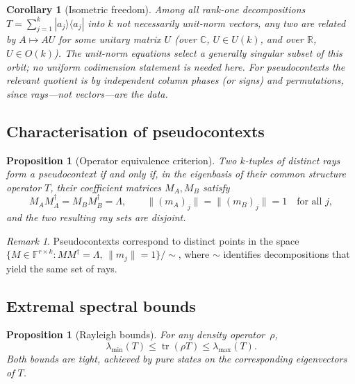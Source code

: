 \documentclass[
  twocolumn,
  aps,
  pra,
  floatfix,
  amsmath,amssymb,
  longbibliography
]{revtex4-2}
\newtheorem{proposition}[theorem]{Proposition}
\newtheorem{corollary}[theorem]{Corollary}
\theoremstyle{definition}
\theoremstyle{remark}
\newtheorem{remark}[theorem]{Remark}
\begin{document}
\begin{corollary}[Isometric freedom]\label{cor:unitary}
Among all rank-one decompositions $T=\sum_{j=1}^{k}|a_j\rangle\langle
a_j|$ into $k$ \emph{not necessarily} unit-norm vectors, any two are
related by $A\mapsto AU$ for some unitary matrix \(U\) (over \(\mathbb C\), \(U\in U(k)\), and over \(\mathbb R\), \(U\in O(k)\)).  The
unit-norm equations select a generally singular subset of this orbit;
no uniform codimension statement is needed here.  For pseudocontexts the
relevant quotient is by independent column phases (or signs) and
permutations, since rays---not vectors---are the data.
\end{corollary}

\subsection{Characterisation of pseudocontexts}

\begin{proposition}[Operator equivalence criterion]\label{prop:pseudo_equiv}
Two \(k\)-tuples of distinct rays form a pseudocontext if and only if, in the eigenbasis of their common structure operator \(T\), their coefficient matrices \(M_A,M_B\) satisfy
\[
M_AM_A^\dagger=M_BM_B^\dagger=\Lambda,
\qquad
\|(m_A)_j\|=\|(m_B)_j\|=1
\quad\text{for all }j,
\]
and the two resulting ray sets are disjoint.
\end{proposition}

\begin{remark}
Pseudocontexts correspond to distinct points in the space
$\{M\in\mathbb{F}^{r\times k}:MM^\dagger=\Lambda,\,\|m_j\|=1\}/{\sim}$,
where $\sim$ identifies decompositions that yield the same set of
rays.
\end{remark}

\subsection{Extremal spectral bounds}

\begin{proposition}[Rayleigh bounds]\label{prop:rayleigh}
For any density operator~$\rho$,
\[
  \lambda_{\min}(T)\le\operatorname{tr}(\rho T)\le\lambda_{\max}(T).
\]
Both bounds are tight, achieved by pure states on the corresponding
eigenvectors of $T$.
\end{proposition}





\end{document}
